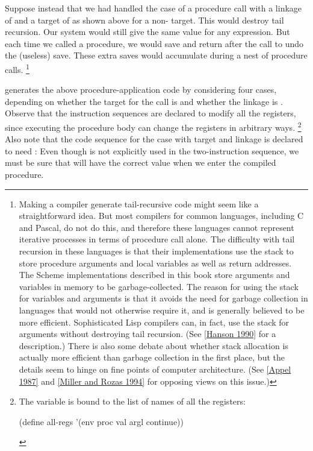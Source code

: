 Suppose instead that we had handled the case of a procedure call with a linkage of  and a target of  as shown above for a non- target.
This would destroy tail recursion.
Our system would still give the same value for any expression.
But each time we called a procedure, we would save  and return after the call to undo the (useless) save.
These extra saves would accumulate during a nest of procedure calls.%
\footnote{
	Making a compiler generate tail-recursive code might seem like a straightforward idea.
	But most compilers for common languages, including C and Pascal, do not do this, and therefore these languages cannot represent iterative processes in terms of procedure call alone.
	The difficulty with tail recursion in these languages is that their implementations use the stack to store procedure arguments and local variables as well as return addresses.
	The Scheme implementations described in this book store arguments and variables in memory to be garbage-collected.
	The reason for using the stack for variables and arguments is that it avoids the need for garbage collection in languages that would not otherwise require it, and is generally believed to be more efficient.
	Sophisticated Lisp compilers can, in fact, use the stack for arguments without destroying tail recursion.
	(See \cref{Hanson 1990} for a description.)
	There is also some debate about whether stack allocation is actually more efficient than garbage collection in the first place, but the details seem to hinge on fine points of computer architecture.
	(See \cref{Appel 1987} and \cref{Miller and Rozas 1994} for opposing views on this issue.)
}

 generates the above procedure-application code by considering four cases, depending on whether the target for the call is  and whether the linkage is .
Observe that the instruction sequences are declared to modify all the registers, since executing the procedure body can change the registers in arbitrary ways.%
\footnote{
	The variable  is bound to the list of names of all the registers:
	\begin{smallscheme}
	  (define all-regs '(env proc val argl continue))
	\end{smallscheme}
}
Also note that the code sequence for the case with target  and linkage  is declared to need :
Even though  is not explicitly used in the two-instruction sequence, we must be sure that  will have the correct value when we enter the compiled procedure.

